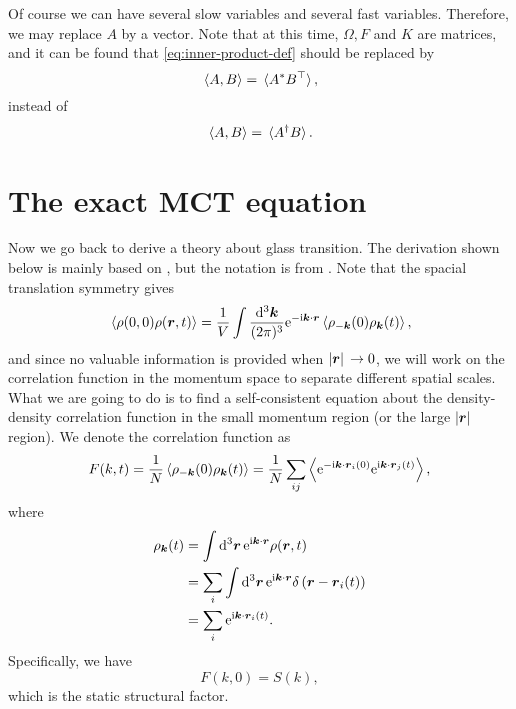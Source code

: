 \documentclass[hyperref, a4paper]{article}
\newcommand*{\ii}{\mathrm{i}}
\newcommand*{\ee}{\mathrm{e}}
\begin{document}
Of course we can have several slow variables and several fast variables. Therefore, we may replace $A$ by a vector. 
Note that at this time, $\Omega, F$ and $K$ are matrices, and it can be found that \eqref{eq:inner-product-def}
should be replaced by 
\begin{equation}
    \expval*{A, B} = \expval*{A^* B^\top},
\end{equation} 
instead of 
\[
    \expval*{A, B} = \expval*{A^\dagger B}.
\]

\section{The exact MCT equation} 

Now we go back to derive a theory about glass transition. 
The derivation shown below is mainly based on \cite{mct2005}, but the notation is from \cite{RevModPhys.76.785}.
Note that the spacial translation symmetry gives 
\begin{equation}
    \expval*{\rho(0, 0) \rho(\vb*{r}, t)} = \frac{1}{V} \int \frac{\dd[3]{\vb*{k}}}{(2\pi)^3} 
    \ee^{- \ii \vb*{k} \cdot \vb*{r}} \expval*{\rho_{-\vb*{k}}(0) \rho_{\vb*{k}}(t)},
\end{equation}
and since no valuable information is provided when $\abs*{\vb*{r}} \to 0$, we will work on the correlation function
in the momentum space to separate different spatial scales.
What we are going to do is to find a self-consistent equation about the density-density correlation function in 
the small momentum region (or the large $\abs*{\vb*{r}}$ region). We denote the correlation function as 
\begin{equation}
    F(k, t)=\frac{1}{N}\left\langle\rho_{-\vb*{k}}(0) \rho_{\vb*{k}}(t)\right\rangle=\frac{1}{N} \sum_{i j}\left\langle \ee^{-\ii \vb*{k} \cdot \vb*{r}_{i}(0)} \ee^{\ii \vb*{k} \cdot \vb*{r}_{j}(t)}\right\rangle,
\end{equation}
where 
\begin{equation}
    \begin{aligned}
        \rho_{\vb*{k}}(t) &= \int \dd[3]{\vb*{r}} \ee^{\ii \vb*{k} \cdot \vb*{r}} \rho(\vb*{r}, t) \\
        &=\sum_{i} \int \dd[3]{\vb*{r}} \ee^{\ii \vb*{k} \cdot \vb*{r}} \delta\left(\vb*{r}-\vb*{r}_{i}(t)\right) \\
        &=\sum_{i} \ee^{\ii \vb*{k} \cdot \vb*{r}_{i}(t)}.
    \end{aligned}
\end{equation}
Specifically, we have 
\begin{equation}
    F(k, 0) = S(k),
\end{equation}
which is the static structural factor.
\end{document}
